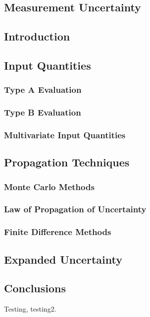 \documentclass[../thesis.tex]{subfiles}
\begin{document}
\begin{refsection}
\chapter{Measurement Uncertainty}
\section{Introduction}
\section{Input Quantities}
\subsection{Type A Evaluation}
\subsection{Type B Evaluation}
\subsection{Multivariate Input Quantities}
\section{Propagation Techniques}
\subsection{Monte Carlo Methods}
\subsection{Law of Propagation of Uncertainty}
\subsection{Finite Difference Methods}
\section{Expanded Uncertainty}
\section{Conclusions}
Testing, testing2\cite{Stant_2017}.
\printbibliography
\end{refsection}
\end{document}
